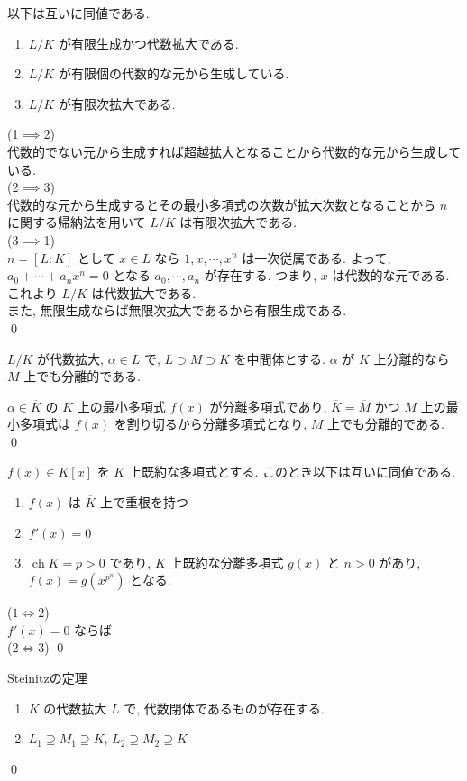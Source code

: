 \documentclass[uplatex,dvipdfmx,a4paper,11pt]{jlreq}
\makeatletter
\DeclareMathOperator{\ch}{ch}
\theoremstyle{definition}
\renewenvironment{proof}[1][\proofname]{\par
  \normalfont
  \topsep6\p@\@plus6\p@ \trivlist
  \item[\hskip\labelsep{\bfseries #1}\@addpunct{\bfseries}]\ignorespaces\quad\par
}{%
  \qed\endtrivlist\@endpefalse
}
\renewcommand\proofname{証明}
\makeatother
\begin{document}
\begin{theorem}
  以下は互いに同値である.
  \begin{enumerate}
    \item $L/K$ が有限生成かつ代数拡大である.
    \item $L/K$ が有限個の代数的な元から生成している.
    \item $L/K$ が有限次拡大である.
  \end{enumerate}
\end{theorem}
\begin{proof}
  (1$\implies$2) \\
  代数的でない元から生成すれば超越拡大となることから代数的な元から生成している. \\
  (2$\implies$3) \\
  代数的な元から生成するとその最小多項式の次数が拡大次数となることから $n$ に関する帰納法を用いて $L/K$ は有限次拡大である. \\
  (3$\implies$1) \\
  $n = [L : K]$ として $x\in L$ なら $1, x, \cdots, x^n$ は一次従属である. よって, $a_0+\cdots+a_nx^n = 0$ となる $a_0,\cdots,a_n$ が存在する. つまり, $x$ は代数的な元である. これより $L/K$ は代数拡大である. \\
  また, 無限生成ならば無限次拡大であるから有限生成である. \\
\end{proof}

\begin{proposition}
  $L/K$ が代数拡大, $\alpha\in L$ で, $L\supset M\supset K$ を中間体とする. $\alpha$ が $K$ 上分離的なら $M$ 上でも分離的である.
\end{proposition}
\begin{proof}
  $\alpha\in\overline{K}$ の $K$ 上の最小多項式 $f(x)$ が分離多項式であり, $\overline{K} = \overline{M}$ かつ $M$ 上の最小多項式は $f(x)$ を割り切るから分離多項式となり, $M$ 上でも分離的である.
\end{proof}

\begin{proposition}
  $f(x)\in K[x]$ を $K$ 上既約な多項式とする. このとき以下は互いに同値である.
  \begin{enumerate}
    \item $f(x)$ は $\overline{K}$ 上で重根を持つ
    \item $f'(x) = 0$
    \item $\ch K = p > 0$ であり, $K$ 上既約な分離多項式 $g(x)$ と $n > 0$ があり, $f(x) = g(x^{p^n})$ となる.
  \end{enumerate}
\end{proposition}
\begin{proof}
  ($1\iff 2$) \\
  $f'(x) = 0$ ならば \\
  ($2\iff 3$)
\end{proof}

\begin{theorem}
  Steinitzの定理
  \begin{enumerate}
    \item $K$ の代数拡大 $L$ で, 代数閉体であるものが存在する.
    \item $L_1\supseteq M_1\supseteq K$, $L_2\supseteq M_2\supseteq K$
  \end{enumerate}
\end{theorem}
\begin{proof}
\end{proof}
\end{document}
